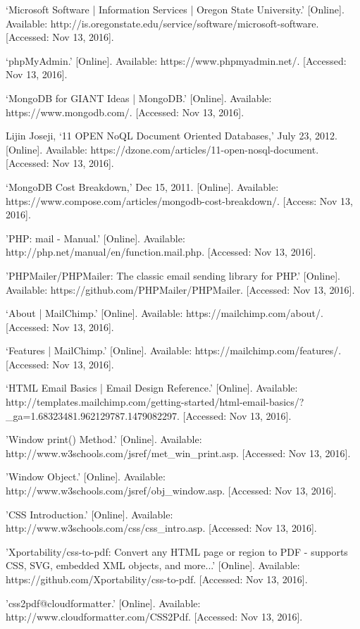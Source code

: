 \documentclass[letterpaper,10pt,serif, draftclsnofoot,onecolumn, compsoc, titlepage]{IEEEtran}
\begin{document}
\begin{thebibliography}{2}
`Microsoft Software | Information Services | Oregon State University.' [Online]. Available: http://is.oregonstate.edu/service/software/microsoft-software. [Accessed: Nov 13, 2016].

`phpMyAdmin.' [Online]. Available: https://www.phpmyadmin.net/. [Accessed: Nov 13, 2016].

`MongoDB for GIANT Ideas | MongoDB.' [Online]. Available: https://www.mongodb.com/. [Accessed: Nov 13, 2016].

Lijin Joseji, `11 OPEN NoQL Document Oriented Databases,' July 23, 2012. [Online]. Available: https://dzone.com/articles/11-open-nosql-document. [Accessed: Nov 13, 2016].

`MongoDB Cost Breakdown,' Dec 15, 2011. [Online]. Available: https://www.compose.com/articles/mongodb-cost-breakdown/. [Access: Nov 13, 2016].

'PHP: mail - Manual.' [Online]. Available: http://php.net/manual/en/function.mail.php. [Accessed: Nov 13, 2016].

'PHPMailer/PHPMailer: The classic email sending library for PHP.' [Online]. Available: https://github.com/PHPMailer/PHPMailer. [Accessed: Nov 13, 2016].

`About | MailChimp.' [Online]. Available: https://mailchimp.com/about/. [Accessed: Nov 13, 2016]. 

`Features | MailChimp.' [Online]. Available: https://mailchimp.com/features/. [Accessed: Nov 13, 2016].

`HTML Email Basics | Email Design Reference.' [Online]. Available: http://templates.mailchimp.com/getting-started/html-email-basics/?\_ga=1.68323481.962129787.1479082297. [Accessed: Nov 13, 2016].

'Window print() Method.' [Online]. Available: http://www.w3schools.com/jsref/met\_win\_print.asp. [Accessed: Nov 13, 2016].

'Window Object.'  [Online]. Available: http://www.w3schools.com/jsref/obj\_window.asp. [Accessed: Nov 13, 2016].

'CSS Introduction.' [Online]. Available: http://www.w3schools.com/css/css\_intro.asp. [Accessed: Nov 13, 2016].

'Xportability/css-to-pdf: Convert any HTML page or region to PDF - supports CSS, SVG, embedded XML objects, and more...' [Online]. Available: https://github.com/Xportability/css-to-pdf. [Accessed: Nov 13, 2016].

'css2pdf@cloudformatter.' [Online]. Available: http://www.cloudformatter.com/CSS2Pdf. [Accessed: Nov 13, 2016].


\end{thebibliography}
\end{document}
